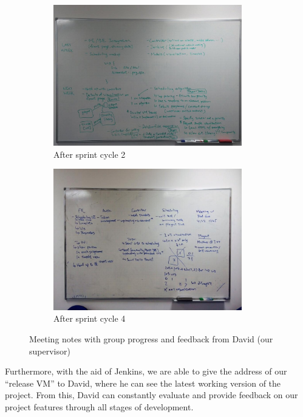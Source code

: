 \documentclass[a4paper, titlepage]{article}
\begin{document}
\begin{figure}[ht]
  \begin{subfigure}{0.5\textwidth}
    \centering
    \includegraphics[width = 0.9\textwidth, trim = 0 0.4cm 0 1.6cm, clip]{./eval/meeting-board2.jpg}
    \caption{After sprint cycle 2}
  \end{subfigure}
  \begin{subfigure}{0.5\textwidth}
    \centering
    \includegraphics[width = 0.9\textwidth, trim = 1.2cm 1.5cm 1.2cm 2.5cm, clip]{./eval/meeting-board.jpg}
    \caption{After sprint cycle 4}
  \end{subfigure}
  \caption{Meeting notes with group progress and feedback from David (our supervisor)}
  \label{fig:eval_meetingboard}
\end{figure}

Furthermore, with the aid of Jenkins, we are able to give the address of our ``release VM'' to David, where he can see the latest working version of the project. From this, David can constantly evaluate and provide feedback on our project features through all stages of development.
\end{document}
